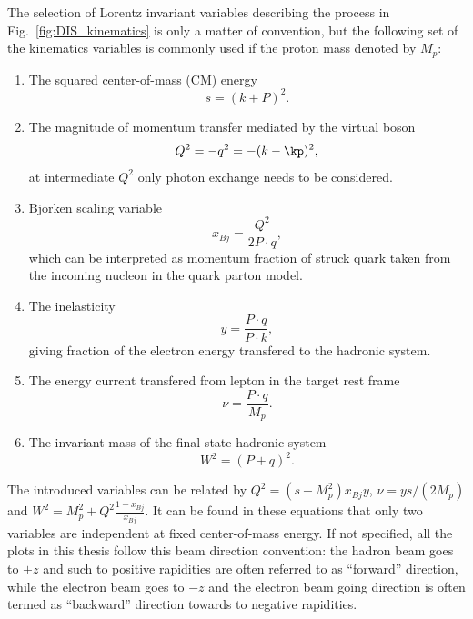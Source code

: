 The selection of Lorentz invariant variables describing the process in
Fig.~\ref{fig:DIS_kinematics} is only a matter of convention, but the following
set of the kinematics variables is commonly used if the proton mass denoted by $M_{p}$:
\begin{enumerate}
\item The squared center-of-mass (CM) energy
\begin{equation}
	s = (k+P)^{2}.
\end{equation}

\item The magnitude of momentum transfer mediated by the virtual boson
\begin{equation}
Q^{2} = -q^{2} = -(k-\kp)^{2},
\end{equation}
at intermediate $Q^{2}$ only photon exchange needs to be considered.

\item Bjorken scaling variable
\begin{equation}
x_{Bj} = \frac{Q^{2}}{2P\cdot q},
\end{equation}
which can be interpreted as momentum fraction of
struck quark taken from the incoming nucleon in the quark parton model.

\item The inelasticity
\begin{equation}
y = \frac{P\cdot q}{ P\cdot k},
\end{equation}
giving fraction of the electron energy transfered to
the hadronic system.

\item The energy current transfered from lepton in the target rest frame
\begin{equation}
\nu = \frac{P\cdot q}{ M_{p} }.
\end{equation}

\item The invariant mass of the final state hadronic system
\begin{equation}
W^{2} = (P+q)^{2}.
\end{equation}

\end{enumerate}

The introduced variables can be related by
$Q^{2}=(s-M^{2}_{p})x_{Bj}y$, $\nu = ys/(2M_{p})$ and
$W^{2}=M^{2}_{p}+Q^{2}\frac{1-x_{Bj}}{x_{Bj}}$. It can be found in these
equations that only two variables are independent at fixed center-of-mass
energy. If not specified, all the plots in this thesis follow this beam direction
convention: the hadron beam goes to $+z$ and such to positive rapidities are
often referred to as ``forward'' direction, while the electron beam goes to $-z$
and the electron beam going direction is often termed as ``backward'' direction
towards to negative rapidities.



